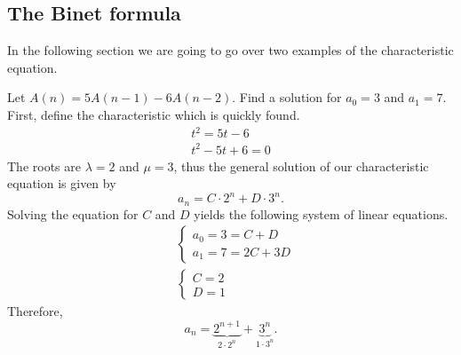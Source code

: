 \subsection{The Binet formula}
In the following section we are going to go over two examples of the characteristic equation. 
\begin{exmp}
Let $A(n)=5 A(n-1)-6A(n-2)$. Find a solution for $a_0=3$ and $a_1=7$. First, define the characteristic which is quickly found.
\begin{align*}
t^2=5t-6\\
t^2-5t+6=0
\end{align*}
The roots are $\lambda=2$ and $\mu=3$, thus the general solution of our characteristic equation is given by
$$
a_n=C \cdot 2^n + D \cdot 3^n.
$$
Solving the equation for $C$ and $D$ yields the following system of linear equations.
\begin{align*}
    &\begin{cases}
        a_0 = 3 = C + D\\    
        a_1 = 7 = 2C + 3D   
    \end{cases}\\
    &\begin{cases}
        C=2\\
        D=1
    \end{cases}
\end{align*}
Therefore, 
$$
a_n=\underbrace{2^{n+1}}_{2 \cdot 2^n} + \underbrace{3^n}_{1 \cdot 3^n}.
$$
\end{exmp}
\newpage
